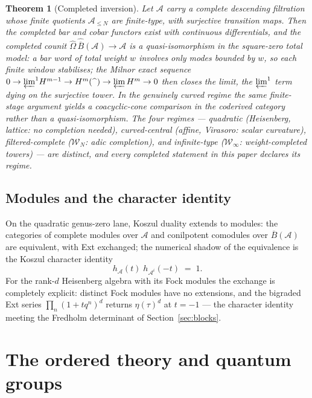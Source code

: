 \documentclass[11pt]{amsart}
\numberwithin{equation}{section}
\theoremstyle{plain}
\newtheorem{theorem}{Theorem}[section]
\theoremstyle{definition}
\theoremstyle{remark}
\newcommand{\cA}{\mathcal{A}}
\newcommand{\cW}{\mathcal{W}}
\newcommand{\barB}{\overline{B}}
\begin{document}
\begin{theorem}[Completed inversion]\label{thm:completed}
Let $\cA$ carry a complete descending filtration whose finite quotients
$\cA_{\leq N}$ are finite-type, with surjective transition maps. Then the
completed bar and cobar functors exist with continuous differentials, and
the completed counit
$\widehat\Omega\,\widehat{\barB}(\cA)\to\cA$ is a quasi-isomorphism in
the square-zero total model: a bar word of total weight $w$ involves only
modes bounded by $w$, so each finite window stabilises; the Milnor exact
sequence
$0\to{\varprojlim}^{1}H^{m-1}\to H^{m}(\widehat{\phantom{x}})\to
\varprojlim H^{m}\to0$
then closes the limit, the $\varprojlim^1$ term dying on the surjective
tower. In the genuinely curved regime the same finite-stage argument
yields a coacyclic-cone comparison in the coderived category rather than
a quasi-isomorphism. The four regimes --- quadratic (Heisenberg,
lattice: no completion needed), curved-central (affine, Virasoro:
scalar curvature), filtered-complete ($\cW_N$: adic completion), and
infinite-type ($\cW_\infty$: weight-completed towers) --- are distinct,
and every completed statement in this paper declares its regime.
\end{theorem}

\subsection{Modules and the character identity}

On the quadratic genus-zero lane, Koszul duality extends to modules: the
categories of complete modules over $\cA$ and conilpotent comodules over
$\barB(\cA)$ are equivalent, with Ext exchanged; the numerical shadow of
the equivalence is the Koszul character identity
\begin{equation}\label{eq:character}
h_{\cA}(t)\;h_{\cA^{i}}(-t)\;=\;1 .
\end{equation}
For the rank-$d$ Heisenberg algebra with its Fock modules the exchange
is completely explicit: distinct Fock modules have no extensions, and
the bigraded Ext series $\prod_n(1+tq^{n})^{d}$ returns
$\eta(\tau)^{d}$ at $t=-1$ --- the character identity meeting the
Fredholm determinant of Section~\ref{sec:blocks}.

\section{The ordered theory and quantum groups}\label{sec:ordered}
\end{document}
